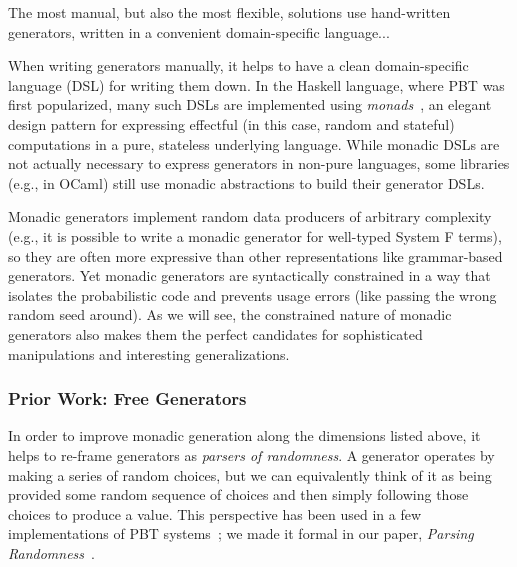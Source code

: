 The most manual, but also the most flexible, solutions use hand-written
generators, written in a convenient domain-specific language...

When writing generators manually, it helps to have a clean domain-specific
language (DSL) for writing them down. In the Haskell language, where PBT was
first popularized, many such DSLs are implemented using {\em
monads\/}~\cite{moggi1991notions}, an elegant design pattern for
expressing effectful (in this case, random and stateful) computations
in a pure, stateless underlying
language. While monadic DSLs are not actually necessary to express generators in
non-pure languages, some libraries (e.g., in OCaml) still use monadic
abstractions to build their generator DSLs.

Monadic generators implement random data producers of arbitrary complexity
(e.g., it is possible to write a monadic generator for well-typed System F
terms), so they are often more expressive than other representations like
grammar-based generators.  Yet monadic generators are syntactically constrained
in a way that isolates the probabilistic code and prevents usage errors (like
passing the wrong random seed around). As we will see, the constrained nature of
monadic generators also makes them the perfect candidates for sophisticated
manipulations and interesting generalizations.

\subsubsection{Prior Work: Free Generators}
In order to improve monadic generation along the dimensions listed
above, it helps to re-frame generators as {\em parsers of randomness}. A generator
operates by making a series of random choices, but we can equivalently think of
it as being provided some random sequence of choices and then simply following
those choices to produce a value. This perspective has been used in a few
implementations of PBT
systems~\cite{maciver2019hypothesis, dolan2017testing}; we made it
formal in our paper, {\em Parsing Randomness}~\cite{goldstein2022parsing}.

